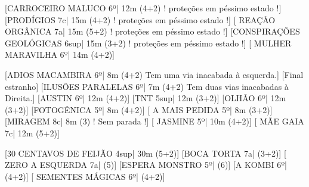 
\begin{CGSectorRoutes}
    [CARROCEIRO MALUCO 6º| 12m (4+2) ! proteções em péssimo estado !]
    [PRODÍGIOS 7c| 15m (4+2) ! proteções em péssimo estado !]
    [ REAÇÃO ORGÂNICA 7a| 15m (5+2) ! proteções em péssimo estado !]
    [CONSPIRAÇÕES GEOLÓGICAS 6sup| 15m (3+2) ! proteções em péssimo estado !]
    [ MULHER MARAVILHA 6º| 14m (4+2)]
\end{CGSectorRoutes}

\begin{CGSectorRoutes}
    [ADIOS MACAMBIRA 6º| 8m (4+2) Tem uma via inacabada à esquerda.]
    [Final estranho]
    [ILUSÕES PARALELAS 6º| 7m (4+2) Tem duas vias inacabadas à Direita.]
    [AUSTIN 6º| 12m (4+2)]
    [TNT 5sup| 12m (3+2)]
    [OLHÃO 6º| 12m (3+2)]
    [FOTOGÊNICA 5º| 8m (4+2)]
    [ A MAIS PEDIDA 5º| 8m (3+2)]
    [MIRAGEM 8c| 8m (3) ! Sem parada !]
    [ JASMINE 5º| 10m (4+2)]
    [ MÃE GAIA 7c| 12m (5+2)]
\end{CGSectorRoutes}

\begin{CGSectorRoutes}
    [30 CENTAVOS DE FEIJÃO 4sup| 30m (5+2)]
    [BOCA TORTA 7a| (3+2)]
    [ ZERO A ESQUERDA 7a| (5)]
    [ESPERA MONSTRO 5º| (6)]
    [A KOMBI 6º| (4+2)]
    [ SEMENTES MÁGICAS 6º| (4+2)]
\end{CGSectorRoutes}


